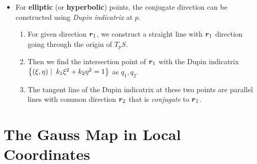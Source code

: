\documentclass[11pt]{article}
\begin{document}
\begin{itemize}
\item For \textbf{elliptic} (or \textbf{hyperbolic}) points, the conjugate direction can be constructed using \emph{Dupin indicatrix} at $p$. 
\begin{enumerate}
\item For given direction $\boldsymbol{r}_{1}$, we construct a straight line with $\boldsymbol{r}_{1}$ direction going through the origin of $T_{p}S$.
\item Then we find the intersection point of $\boldsymbol{r}_{1}$ with the Dupin indicatrix $\left\{(\xi, \eta)\;| \;\;k_{1}\xi^{2} + k_{2}\eta^{2} = 1\right\}$ as $q_{1}, q_{2}$. 
\item The tangent line of the Dupin indicatrix at these two points are parallel lines with common direction $\boldsymbol{r}_{2}$ that is \emph{conjugate} to $\boldsymbol{r}_{1}$.
\end{enumerate}
\end{itemize}

\section{The Gauss Map in Local Coordinates}
\end{document}
